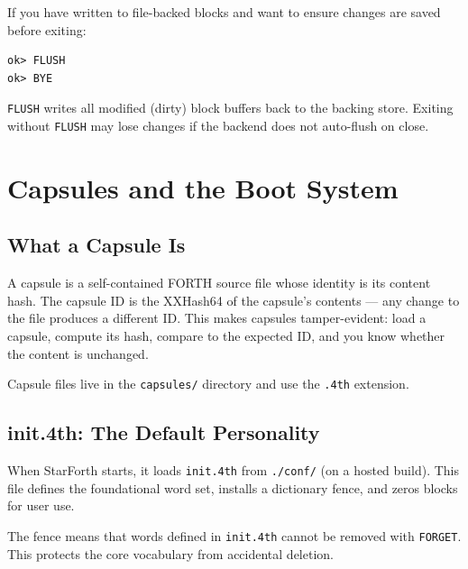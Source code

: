 If you have written to file-backed blocks and want to ensure changes are
saved before exiting:

\begin{lstlisting}[language=Forth]
ok> FLUSH
ok> BYE
\end{lstlisting}

\texttt{FLUSH} writes all modified (dirty) block buffers back to the backing
store. Exiting without \texttt{FLUSH} may lose changes if the backend does
not auto-flush on close.

\chapter{Capsules and the Boot System}
\label{chap:capsules}

\section{What a Capsule Is}
\label{sec:capsule-what}

A capsule is a self-contained FORTH source file whose identity is its content
hash. The capsule ID is the XXHash64 of the capsule's contents --- any change
to the file produces a different ID. This makes capsules tamper-evident:
load a capsule, compute its hash, compare to the expected ID, and you know
whether the content is unchanged.

Capsule files live in the \texttt{capsules/} directory and use the
\texttt{.4th} extension.

\section{init.4th: The Default Personality}
\label{sec:init-4th}

When StarForth starts, it loads \texttt{init.4th} from \texttt{./conf/} (on a
hosted build). This file defines the foundational word set, installs a
dictionary fence, and zeros blocks for user use.

The fence means that words defined in \texttt{init.4th} cannot be removed with
\texttt{FORGET}. This protects the core vocabulary from accidental deletion.

